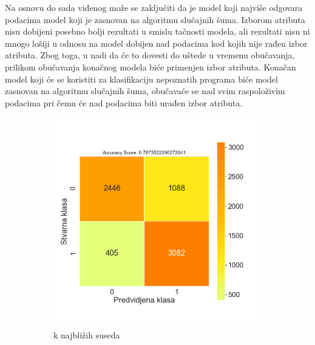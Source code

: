 \documentclass[12pt,oneside]{memoir}
\begin{document}
Na osnovu do sada viđenog može se zaključiti da je model koji najviše odgovara podacima model koji je zasnovan na algoritmu slučajnih šuma. Izborom atributa nisu dobijeni posebno bolji rezultati u smislu tačnosti modela, ali rezultati nisu ni mnogo lošiji u odnosu na model dobijen nad podacima kod kojih nije rađen izbor atributa. Zbog toga, u nadi da će to dovesti do uštede u vremenu obučavanja, prilikom obučavanja konačnog modela biće primenjen izbor atributa. Konačan model koji će se koristiti za klasifikaciju nepoznatih programa biće model zasnovan na algoritmu slučajnih šuma, obučavaće se nad svim raspoloživim podacima pri čemu će nad podacima biti urađen izbor atributa.

\begin{figure}[!ht]
    \centering
    \begin{subfigure}[b]{0.45\textwidth}
        \centering
        \includegraphics[width=\textwidth]{KNN_feature_selection_oversampled_confussion_matrix}
        \caption{k najbližih suseda}
        \label{fig:knear4}
    \end{subfigure}
    \begin{subfigure}[b]{0.45\textwidth}
        \centering

\end{subfigure}
\end{figure}
\end{document}
